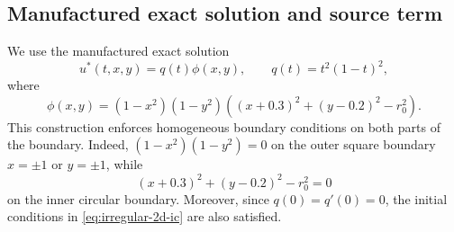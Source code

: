 \documentclass[11pt]{article}
\begin{document}
\subsection{Manufactured exact solution and source term}

We use the manufactured exact solution
\begin{equation}
 u^\ast(t,x,y)=q(t)\phi(x,y),
\qquad
 q(t)=t^2(1-t)^2,
\label{eq:irregular-2d-exact}
\end{equation}
where
\begin{equation}
 \phi(x,y)
 =
 (1-x^2)(1-y^2)
 \left((x+0.3)^2+(y-0.2)^2-r_0^2\right).
\label{eq:irregular-2d-phi}
\end{equation}
This construction enforces homogeneous boundary conditions on both parts of the boundary. Indeed, $(1-x^2)(1-y^2)=0$ on the outer square boundary $x=\pm1$ or $y=\pm1$, while
\[
(x+0.3)^2+(y-0.2)^2-r_0^2=0
\]
on the inner circular boundary. Moreover, since $q(0)=q'(0)=0$, the initial conditions in \eqref{eq:irregular-2d-ic} are also satisfied.
\end{document}
